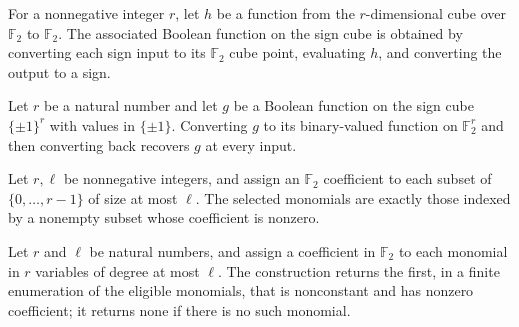 \begin{definition}
\leanok
{}
For a nonnegative integer $r$, let $h$ be a function from the $r$-dimensional cube over
$\mathbb{F}_2$ to $\mathbb{F}_2$. The associated Boolean function on the sign cube is
obtained by converting each sign input to its $\mathbb{F}_2$ cube point, evaluating $h$,
and converting the output to a sign.
\end{definition}

\begin{theorem}
\leanok
{}
Let $r$ be a natural number and let $g$ be a Boolean function on the sign cube
$\{\pm1\}^r$ with values in $\{\pm1\}$. Converting $g$ to its binary-valued function on
$\mathbb F_2^r$ and then converting back recovers $g$ at every input.
\end{theorem}

\begin{definition}
\label{FABL.nonconstantLowDegreeMonomials}
\leanok
{}
Let $r,\ell$ be nonnegative integers, and assign an $\mathbb{F}_2$ coefficient to each
subset of $\{0,\ldots,r-1\}$ of size at most $\ell$. The selected monomials are exactly
those indexed by a nonempty subset whose coefficient is nonzero.
\end{definition}

\begin{definition}
\label{FABL.firstNonconstantLowDegreeMonomial}
\leanok
{}
Let $r$ and $\ell$ be natural numbers, and assign a coefficient in $\mathbb{F}_2$ to
each monomial in $r$ variables of degree at most $\ell$. The construction returns the
first, in a finite enumeration of the eligible monomials, that is nonconstant and has
nonzero coefficient; it returns none if there is no such monomial.
\end{definition}

